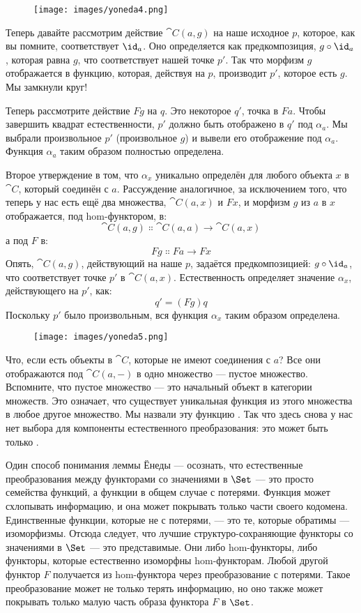 \begin{figure}[H]
  \centering
  \texttt{[image: images/yoneda4.png]}
\end{figure}

\noindent
Теперь давайте рассмотрим действие $\cat{C}(a, g)$ на наше исходное
$p$, которое, как вы помните, соответствует $\id_a$. Оно
определяется как предкомпозиция, $g \circ \id_a$, которая равна $g$,
что соответствует нашей точке $p'$. Так что морфизм
$g$ отображается в функцию, которая, действуя на $p$,
производит $p'$, которое есть $g$. Мы замкнули
круг!

Теперь рассмотрите действие $F g$ на $q$. Это некоторое
$q'$, точка в $F a$. Чтобы завершить квадрат естественности,
$p'$ должно быть отображено в $q'$ под
$\alpha_a$. Мы выбрали произвольное $p'$ (произвольное
$g$) и вывели его отображение под $\alpha_a$. Функция
$\alpha_a$ таким образом полностью определена.

Второе утверждение в том, что $\alpha_x$ уникально определён для любого
объекта $x$ в $\cat{C}$, который соединён с $a$.
Рассуждение аналогичное, за исключением того, что теперь у нас есть ещё два множества,
$\cat{C}(a, x)$ и $F x$, и морфизм $g$ из
$a$ в $x$ отображается, под hom-функтором, в:
\[\cat{C}(a, g) \Colon \cat{C}(a, a) \to \cat{C}(a, x)\]
а под $F$ в:
\[F g \Colon F a \to F x\]
Опять, $\cat{C}(a, g)$, действующий на наше $p$, задаётся
предкомпозицией: $g \circ \id_a$, что соответствует точке
$p'$ в $\cat{C}(a, x)$. Естественность определяет значение
$\alpha_x$, действующего на $p'$, как:
\[q' = (F g) q\]
Поскольку $p'$ было произвольным, вся функция $\alpha_x$
таким образом определена.

\begin{figure}[H]
  \centering
  \texttt{[image: images/yoneda5.png]}
\end{figure}

\noindent
Что, если есть объекты в $\cat{C}$, которые не имеют соединения с
$a$? Все они отображаются под $\cat{C}(a, -)$ в одно множество
--- пустое множество. Вспомните, что пустое множество --- это начальный объект в
категории множеств. Это означает, что существует уникальная функция из этого
множества в любое другое множество. Мы назвали эту функцию . Так что здесь
снова у нас нет выбора для компоненты естественного
преобразования: это может быть только .

Один способ понимания леммы Ёнеды --- осознать, что естественные
преобразования между функторами со значениями в $\Set$ --- это просто семейства
функций, а функции в общем случае с потерями. Функция может
схлопывать информацию, и она может покрывать только части своего кодомена.
Единственные функции, которые не с потерями, --- это те, которые обратимы ---
изоморфизмы. Отсюда следует, что лучшие структуро-сохраняющие
функторы со значениями в $\Set$ --- это представимые. Они либо
hom-функторы, либо функторы, которые естественно изоморфны
hom-функторам. Любой другой функтор $F$ получается из
hom-функтора через преобразование с потерями. Такое преобразование может
не только терять информацию, но оно также может покрывать только малую часть
образа функтора $F$ в $\Set$.

